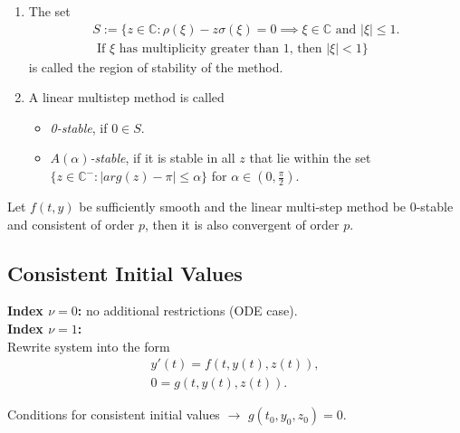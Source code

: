 	\begin{frame}
		\vfill
			\begin{definition}
			\begin{enumerate}
				\item 
				The set
				\begin{equation}
					\begin{aligned}
						S := \{z \in \mathbb{C} : \rho(\xi) - z \sigma(\xi) = 0 \implies \xi \in \mathbb{C} \text{ and } |\xi| \leq 1. \\
						\text{ If $\xi$ has multiplicity greater than $1$, then } |\xi| < 1\}
					\end{aligned}
				\end{equation}
				is called the region of stability of the method.
				\item 
				A linear multistep method is called
				\begin{itemize}
					\item \emph{0-stable}, if $0 \in S$.
					\item \emph{$A(\alpha)$-stable}, if it is stable in all $z$ that lie within the set $\{z \in \mathbb{C}^- : |arg(z)-\pi| \leq \alpha\}$ for $\alpha \in (0, \frac{\pi}{2})$.		 
				\end{itemize}
			\end{enumerate}
		\end{definition}
		\vfill
	\end{frame}
	
	\begin{frame}
		\vfill
		\begin{theorem}%
			\label{th: null-stbaility and consistence is convergence}
			Let $f(t,y)$ be sufficiently smooth and the linear multi-step method be 0-stable and consistent of order $p$, then it is also convergent of order $p$.
		\end{theorem}
		\vfill
	\end{frame}
	
	\subsection{Consistent Initial Values}
	\begin{frame}
		\vfill
		\textbf{Index $\nu = 0$:} no additional restrictions (ODE case).\\ 
		
		\textbf{Index $\nu = 1$:}\\
		
		Rewrite system into the form
		\begin{align*}
			y'(t) = f(t,y(t),z(t)), \\
			0 = g(t,y(t),z(t)).
		\end{align*}
		
		Conditions for consistent initial values $\to$ $g(t_0, y_0, z_0) = 0$.
		\vfill
	\end{frame}
	
